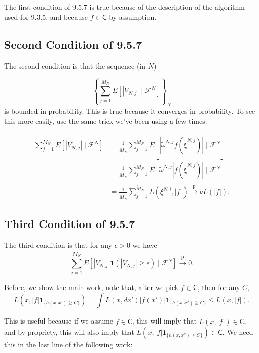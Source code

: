 \documentclass{article}
\begin{document}
The first condition of 9.5.7 is true because of the description of the algorithm used for 9.3.5, and because $f \in \tilde{\mathsf{C}}$ by assumption.

\subsection{Second Condition of 9.5.7}

The second condition is that the sequence (in $N$) 

$$
\left\{ \sum_{j=1}^{\tilde{M}_N} E[|V_{N,j}| \mid \mathcal{F}^N] \right\}_N
$$
is bounded in probability. This is true because it converges in probability. To see this more easily, use the same trick we've been using a few times:

\begin{align*}
\sum_{j=1}^{\tilde{M}_N} E[|V_{N,j}| \mid \mathcal{F}^N] 
&= \frac{1}{\tilde{M}_{N}} \sum_{j=1}^{\tilde{M}_N} E[| \tilde{\omega}^{N,j} f(\tilde{\xi}^{N,j})| \mid \mathcal{F}^N]  \\
&= \frac{1}{\tilde{M}_{N}} \sum_{j=1}^{\tilde{M}_N} E[ \tilde{\omega}^{N,j}| f(\tilde{\xi}^{N,j})| \mid \mathcal{F}^N]  \tag{Assumption 9.3.3 positive RN deriv.}\\
&= \frac{1}{\tilde{M}_N} \sum_{j=1}^{\tilde{M}_N} L(\xi^{N,i}, |f|) \overset{\text{p}}{\to} \nu L(|f|).
\end{align*}


\subsection{Third Condition of 9.5.7}

The third condition is that for any $\epsilon > 0$ we have
$$
\sum_{j=1}^{\tilde{M}_N} E\left[ |V_{N,j}| \mathbf{1}\left( |V_{N,j}| \ge \epsilon \right)  \mid \mathcal{F}^N\right] \overset{\text{p}}{\to} 0.
$$

Before, we show the main work, note that, after we pick $f \in \tilde{\mathsf{C}}$,  then for any $C$,
$$
L(x,|f| \mathbf{1}_{\{h(x,x') \ge C \}}) = \int L(x, dx')\left|f(x')\right| \mathbf{1}_{\{ h(x,x') \ge C \}} \le L(x, |f|).
$$

This is useful because if we assume $f \in \tilde{\mathsf{C}}$, this will imply that $L(x,|f|) \in \mathsf{C}$, and by propriety, this will also imply that $L(x,|f| \mathbf{1}_{\{h(x,x') \ge C \}}) \in \mathsf{C}$. We need this in the last line of the following work: 
\end{document}
